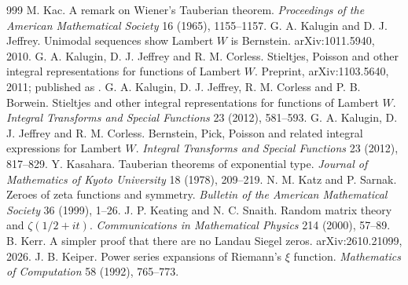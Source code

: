 \begin{thebibliography}{999}
 M. Kac. A remark on Wiener's Tauberian theorem. \emph{Proceedings of the American Mathematical Society} 16 (1965), 1155--1157.
 G. A. Kalugin and D. J. Jeffrey. Unimodal sequences show Lambert $W$ is Bernstein. arXiv:1011.5940, 2010.
 G. A. Kalugin, D. J. Jeffrey and R. M. Corless. Stieltjes, Poisson and other integral representations for functions of Lambert $W$. Preprint, arXiv:1103.5640, 2011; published as \cite{KJCB12,KJC12}.
 G. A. Kalugin, D. J. Jeffrey, R. M. Corless and P. B. Borwein. Stieltjes and other integral representations for functions of Lambert $W$. \emph{Integral Transforms and Special Functions} 23 (2012), 581--593.
 G. A. Kalugin, D. J. Jeffrey and R. M. Corless. Bernstein, Pick, Poisson and related integral expressions for Lambert $W$. \emph{Integral Transforms and Special Functions} 23 (2012), 817--829.
 Y. Kasahara. Tauberian theorems of exponential type. \emph{Journal of Mathematics of Kyoto University} 18 (1978), 209--219.
 N. M. Katz and P. Sarnak. Zeroes of zeta functions and symmetry. \emph{Bulletin of the American Mathematical Society} 36 (1999), 1--26.
 J. P. Keating and N. C. Snaith. Random matrix theory and $\zeta(1/2+it)$. \emph{Communications in Mathematical Physics} 214 (2000), 57--89.
 B. Kerr. A simpler proof that there are no Landau Siegel zeros. arXiv:2610.21099, 2026.
 J. B. Keiper. Power series expansions of Riemann's $\xi$ function. \emph{Mathematics of Computation} 58 (1992), 765--773.

\end{thebibliography}
